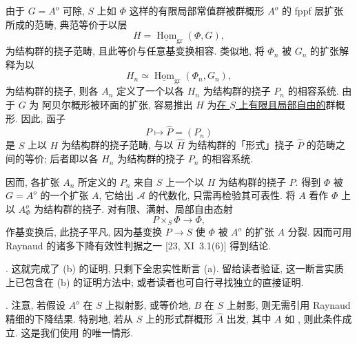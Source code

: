 由于 $G=A^o$ 可除, $S$ 上如 $\Phi$ 这样的有限局部常值群被群概形 $A^o$ 的 fppf 层扩张所成的范畴, 典范等价于以层
\[
 H=\underline{\operatorname{Hom}}_{\mathrm{gr}}(\Phi,G),
\]
为结构群的挠子范畴, 且此等价与任意基变换相容. 类似地, 将 $\Phi_n$ 被 $G_n$ 的扩张解释为以
\[
 H_n\simeq
 \underline{\operatorname{Hom}}_{\mathrm{gr}}(\Phi_n,G_n),
\]
为结构群的挠子, 则各 $A_n$ 定义了一个以各 $H_n$ 为结构群的挠子 $P_n$ 的相容系统. 由于 $G$ 为 阿贝尔概形被环面的扩张, 容易推出 $H$ 为\underline{在 $S$ 上有限且局部自由的}群概形. 因此, 函子
\[
 P\longmapsto\widehat P=(P_n)
\]
是 $S$ 上以 $H$ 为结构群的挠子范畴, 与以 $\widehat H$ 为结构群的「形式」挠子 $\widehat P$ 的范畴之间的等价; 后者即以各 $H_n$ 为结构群的挠子 $P_n$ 的相容系统.

因而, 各扩张 $A_n$ 所定义的 $P_n$ 来自 $S$ 上一个以 $H$ 为结构群的挠子 $P$. 得到 $\Phi$ 被 $G=A^o$ 的一个扩张 $A$, 它给出 $\mathcal A$ 的代数化, 只需再检验其可表性. 将 $A$ 看作 $\Phi$ 上以 $A^o_\Phi$ 为结构群的挠子. 对有限、满射、局部自由态射
\[
 P\times_S\Phi\longrightarrow\Phi,
\]
作基变换后, 此挠子平凡, 因为基变换 $P\longrightarrow S$ 使 $\Phi$ 被 $A^o$ 的扩张 $A$ 分裂. 因而可用 Raynaud 的诸多下降有效性判据之一 [23, XI~3.1(6)] 得到结论.

\medskip
\noindent
{}. 这就完成了 (b) 的证明, 只剩下全忠实性断言 (a). 留给读者验证, 这一断言实质上已包含在 (b) 的证明方法中; 或者读者也可自行寻找独立的直接证明.

\medskip
\noindent
{}. 注意, 若假设 $A^o$ 在 $S$ 上拟射影, 或等价地, $B$ 在 $S$ 上射影, 则无需引用 Raynaud 精细的下降结果. 特别地, 若从 $S$ 上的形式群概形 $\widehat A$ 出发, 其中 $A$ 如 , 则此条件成立. 这是我们使用  的唯一情形.



